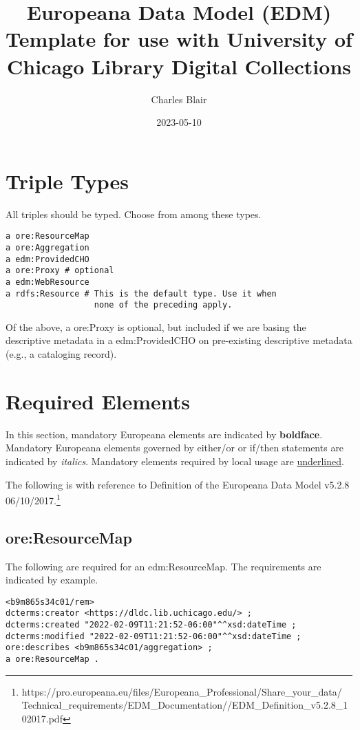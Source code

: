 \documentclass[11pt]{article}
\date{2023-05-10}
\title{Europeana Data Model (EDM) Template for use with University of Chicago Library Digital Collections}
\author{Charles Blair}
\begin{document}
\maketitle

\section{Triple Types}
All triples should be typed. Choose from among these types.

\begin{lstlisting}
a ore:ResourceMap
a ore:Aggregation
a edm:ProvidedCHO
a ore:Proxy # optional
a edm:WebResource
a rdfs:Resource # This is the default type. Use it when
                  none of the preceding apply.
\end{lstlisting}

Of the above, a ore:Proxy is optional, but included if we are basing the descriptive metadata in a edm:ProvidedCHO on pre-existing descriptive metadata (e.g., a cataloging record).

\section{Required Elements}
In this section, mandatory Europeana elements are indicated by \textbf{boldface}. Mandatory Europeana elements governed by either/or or if/then statements are indicated by \textit{italics}. Mandatory elements required by local usage are \underline{underlined}.

The following is with reference to Definition of the Europeana Data Model v5.2.8 06/10/2017.\footnote{https://pro.europeana.eu/files/Europeana\_Professional/Share\_your\_data/
Technical\_requirements/EDM\_Documentation//EDM\_Definition\_v5.2.8\_102017.pdf}

\subsection{ore:ResourceMap}

The following are required for an edm:ResourceMap. The requirements are indicated by example.

\begin{verbatim}
<b9m865s34c01/rem>
dcterms:creator <https://dldc.lib.uchicago.edu/> ;
dcterms:created "2022-02-09T11:21:52-06:00"^^xsd:dateTime ;
dcterms:modified "2022-02-09T11:21:52-06:00"^^xsd:dateTime ;
ore:describes <b9m865s34c01/aggregation> ;
a ore:ResourceMap .
\end{verbatim}
\end{document}
